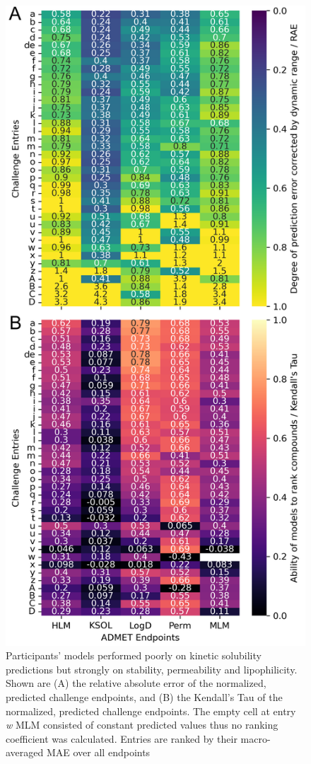\documentclass[journal=jcim,manuscript=article]{achemso}
\begin{document}
\begin{figure}
    \includegraphics[scale=0.6]{04_figs_leaderboards/heatmaps.png}
  \caption{Participants' models performed poorly on kinetic solubility predictions but strongly on stability, permeability and lipophilicity. Shown are (A) the relative absolute error of the normalized, predicted challenge endpoints, and (B) the Kendall's Tau of the normalized, predicted challenge endpoints. The empty cell at entry \textit{w} MLM consisted of constant predicted values thus no ranking coefficient was calculated. Entries are ranked by their macro-averaged MAE over all endpoints}
  \label{fgr:heatmaps_admet}
\end{figure}
\end{document}
